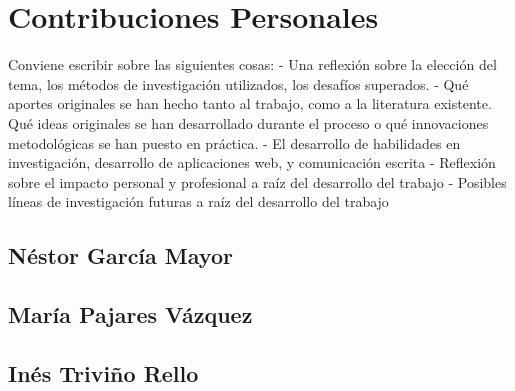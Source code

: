 \chapter*{Contribuciones Personales}
\label{cap:contribucionesPersonales}

Conviene escribir sobre las siguientes cosas:
- Una reflexión sobre la elección del tema, los métodos de investigación utilizados, los desafíos superados.
- Qué aportes originales se han hecho tanto al trabajo, como a la literatura existente. Qué ideas originales se han desarrollado durante el proceso o qué innovaciones metodológicas se han puesto en práctica.
- El desarrollo de habilidades en investigación, desarrollo de aplicaciones web, y comunicación escrita
- Reflexión sobre el impacto personal y profesional a raíz del desarrollo del trabajo
- Posibles líneas de investigación futuras a raíz del desarrollo del trabajo

\section*{Néstor García Mayor}

\section*{María Pajares Vázquez}

\section*{Inés Triviño Rello}
